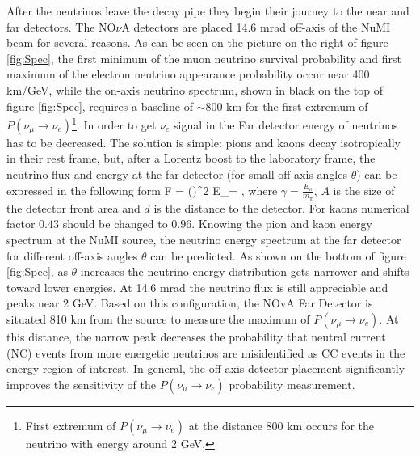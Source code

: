 After the neutrinos leave the decay pipe they begin their journey to the near and far detectors.
The NO$\nu$A detectors are placed 14.6 mrad off-axis of the NuMI beam for several reasons. As can
be seen on the picture on the right of figure \ref{fig:Spec}, the first minimum of the muon neutrino survival
probability and first maximum of the electron neutrino appearance probability occur near 400 km/GeV,
while the on-axis neutrino spectrum, shown in black on the top of figure \ref{fig:Spec}, requires a
baseline of $\sim$800 km for the first extremum of $P(\nu_\mu \rightarrow \nu_e)$\footnote{First extremum
of $P(\nu_\mu \rightarrow \nu_e)$ at the distance 800 km occurs for the neutrino with energy around 2 GeV.}. 
In order to get $\nu_e$ signal in the Far detector energy of neutrinos has to be decreased. The solution is 
simple: pions and kaons decay isotropically in their rest frame, but, after a Lorentz boost to
the laboratory frame, the neutrino flux and energy at the far detector (for small off-axis angles $\theta$)
can be expressed in the following form
\be
F = \Big(\Big)^2
\ee
\be
E_\nu = ,
\ee
where $\gamma = \frac{E_\pi}{m_\pi}$, $A$ is the size of the detector front area and $d$ is 
the distance to the detector. For kaons numerical factor $0.43$ should be changed to $0.96$. 
Knowing the pion and kaon energy spectrum at the NuMI source, the neutrino energy spectrum at
the far detector for different off-axis angles $\theta$ can be predicted. As shown on the bottom of
figure \ref{fig:Spec}, as $\theta$ increases the neutrino energy distribution gets narrower and shifts
toward lower energies. At 14.6 mrad the neutrino flux is still appreciable and peaks near 2 GeV.
Based on this configuration, the NOvA Far Detector is situated 810 km from the source to measure
the maximum of $P(\nu_\mu \rightarrow \nu_e)$. At this distance, the narrow peak decreases the
probability that neutral current (NC) events from more energetic neutrinos are misidentified
as CC events in the energy region of interest. In general, the off-axis detector placement
significantly improves the sensitivity of the $P(\nu_\mu \rightarrow \nu_e)$ probability measurement.
